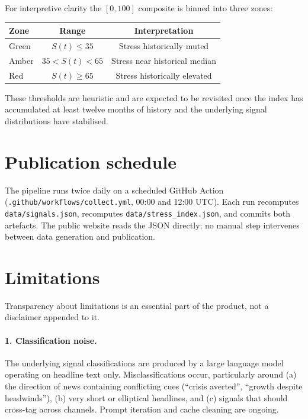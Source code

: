\documentclass[11pt, a4paper]{article}
\begin{document}
For interpretive clarity the $[0, 100]$ composite is binned into three
zones:

\begin{center}
\begin{tabular}{lcc}
\toprule
\textbf{Zone} & \textbf{Range} & \textbf{Interpretation} \\
\midrule
Green  & $S(t) \le 35$   & Stress historically muted \\
Amber  & $35 < S(t) < 65$ & Stress near historical median \\
Red    & $S(t) \ge 65$   & Stress historically elevated \\
\bottomrule
\end{tabular}
\end{center}

These thresholds are heuristic and are expected to be revisited once
the index has accumulated at least twelve months of history and the
underlying signal distributions have stabilised.

\section{Publication schedule}

The pipeline runs twice daily on a scheduled GitHub Action
(\texttt{.github/workflows/collect.yml}, 00:00 and 12:00 UTC). Each run
recomputes \texttt{data/signals.json}, recomputes
\texttt{data/stress\_index.json}, and commits both artefacts. The
public website reads the JSON directly; no manual step intervenes
between data generation and publication.

\section{Limitations}

Transparency about limitations is an essential part of the product, not
a disclaimer appended to it.

\paragraph{1. Classification noise.} The underlying signal
classifications are produced by a large language model operating on
headline text only. Misclassifications occur, particularly around
(a) the direction of news containing conflicting cues (``crisis
averted'', ``growth despite headwinds''), (b) very short or elliptical
headlines, and (c) signals that should cross-tag across channels.
Prompt iteration and cache cleaning are ongoing.
\end{document}

